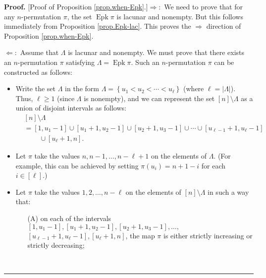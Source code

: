 \documentclass[numbers=enddot,12pt,final,onecolumn,notitlepage]{scrartcl}%
\theoremstyle{definition}
\newenvironment{proof}[1][Proof]{\noindent\textbf{#1.} }{\ \rule{0.5em}{0.5em}}
\newenvironment{verlong}{}{}
\begin{document}
\begin{verlong}


\begin{proof}
[Proof of Proposition \ref{prop.when-Epk}.]$\Longrightarrow:$ We need to prove
that for any $n$-permutation $\pi$, the set $\operatorname*{Epk}\pi$ is
lacunar and nonempty. But this follows immediately from Proposition
\ref{prop.Epk-lac}. This proves the $\Longrightarrow$ direction of Proposition
\ref{prop.when-Epk}.

$\Longleftarrow:$ Assume that $\Lambda$ is lacunar and nonempty. We must prove
that there exists an $n$-permutation $\pi$ satisfying $\Lambda
=\operatorname*{Epk}\pi$. Such an $n$-permutation $\pi$ can be constructed as follows:

\begin{itemize}
\item Write the set $\Lambda$ in the form $\Lambda=\left\{  u_{1}<u_{2}%
<\cdots<u_{\ell}\right\}  $ (where $\ell=\left\vert \Lambda\right\vert $).
Thus, $\ell\geq1$ (since $\Lambda$ is nonempty), and we can represent the set
$\left[  n\right]  \setminus\Lambda$ as a union of disjoint intervals as
follows:
\begin{align*}
&  \left[  n\right]  \setminus\Lambda\\
&  =\left[  1,u_{1}-1\right]  \cup\left[  u_{1}+1,u_{2}-1\right]  \cup\left[
u_{2}+1,u_{3}-1\right]  \cup\cdots\cup\left[  u_{\ell-1}+1,u_{\ell}-1\right]
\\
&  \ \ \ \ \ \ \ \ \ \ \cup\left[  u_{\ell}+1,n\right]  .
\end{align*}


\item Let $\pi$ take the values $n,n-1,\ldots,n-\ell+1$ on the elements of
$\Lambda$. (For example, this can be achieved by setting $\pi\left(
u_{i}\right)  =n+1-i$ for each $i\in\left[  \ell\right]  $.)

\item Let $\pi$ take the values $1,2,\ldots,n-\ell$ on the elements of
$\left[  n\right]  \setminus\Lambda$ in such a way that:

\begin{itemize}
\item[(A)] on each of the intervals $\left[  1,u_{1}-1\right]  ,\left[
u_{1}+1,u_{2}-1\right]  ,\left[  u_{2}+1,u_{3}-1\right]  ,\ldots,$%
\newline$\left[  u_{\ell-1}+1,u_{\ell}-1\right]  ,\left[  u_{\ell}+1,n\right]
$, the map $\pi$ is either strictly increasing or strictly decreasing;


\end{itemize}
\end{itemize}
\end{proof}
\end{verlong}
\end{document}
